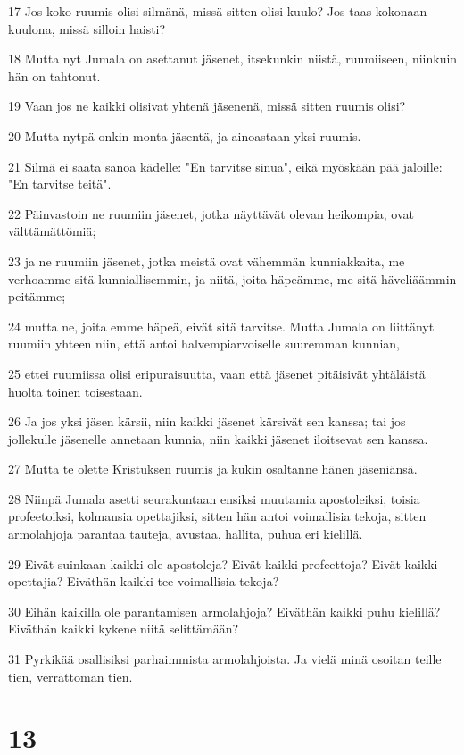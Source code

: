 \par 17 Jos koko ruumis olisi silmänä, missä sitten olisi kuulo? Jos taas kokonaan kuulona, missä silloin haisti?
\par 18 Mutta nyt Jumala on asettanut jäsenet, itsekunkin niistä, ruumiiseen, niinkuin hän on tahtonut.
\par 19 Vaan jos ne kaikki olisivat yhtenä jäsenenä, missä sitten ruumis olisi?
\par 20 Mutta nytpä onkin monta jäsentä, ja ainoastaan yksi ruumis.
\par 21 Silmä ei saata sanoa kädelle: "En tarvitse sinua", eikä myöskään pää jaloille: "En tarvitse teitä".
\par 22 Päinvastoin ne ruumiin jäsenet, jotka näyttävät olevan heikompia, ovat välttämättömiä;
\par 23 ja ne ruumiin jäsenet, jotka meistä ovat vähemmän kunniakkaita, me verhoamme sitä kunniallisemmin, ja niitä, joita häpeämme, me sitä häveliäämmin peitämme;
\par 24 mutta ne, joita emme häpeä, eivät sitä tarvitse. Mutta Jumala on liittänyt ruumiin yhteen niin, että antoi halvempiarvoiselle suuremman kunnian,
\par 25 ettei ruumiissa olisi eripuraisuutta, vaan että jäsenet pitäisivät yhtäläistä huolta toinen toisestaan.
\par 26 Ja jos yksi jäsen kärsii, niin kaikki jäsenet kärsivät sen kanssa; tai jos jollekulle jäsenelle annetaan kunnia, niin kaikki jäsenet iloitsevat sen kanssa.
\par 27 Mutta te olette Kristuksen ruumis ja kukin osaltanne hänen jäseniänsä.
\par 28 Niinpä Jumala asetti seurakuntaan ensiksi muutamia apostoleiksi, toisia profeetoiksi, kolmansia opettajiksi, sitten hän antoi voimallisia tekoja, sitten armolahjoja parantaa tauteja, avustaa, hallita, puhua eri kielillä.
\par 29 Eivät suinkaan kaikki ole apostoleja? Eivät kaikki profeettoja? Eivät kaikki opettajia? Eiväthän kaikki tee voimallisia tekoja?
\par 30 Eihän kaikilla ole parantamisen armolahjoja? Eiväthän kaikki puhu kielillä? Eiväthän kaikki kykene niitä selittämään?
\par 31 Pyrkikää osallisiksi parhaimmista armolahjoista. Ja vielä minä osoitan teille tien, verrattoman tien.

\chapter{13}

